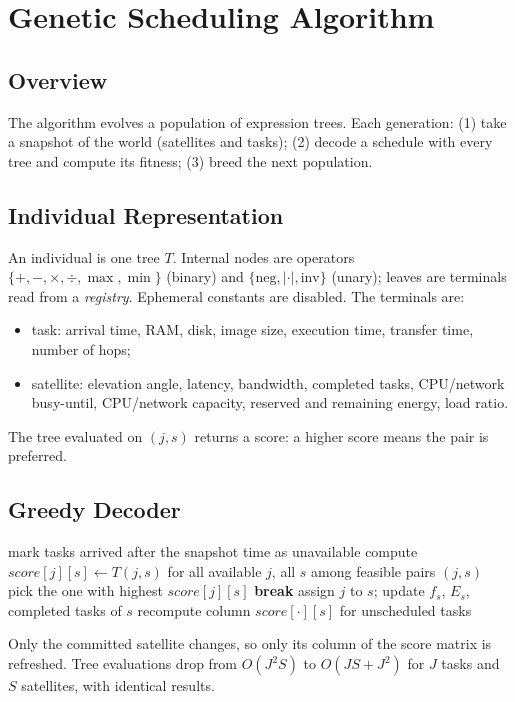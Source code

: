\chapter{Genetic Scheduling Algorithm}
\label{ch:method}

\section{Overview}
The algorithm evolves a population of expression trees. Each generation:
(1) take a snapshot of the world (satellites and tasks); (2) decode a schedule
with every tree and compute its fitness; (3) breed the next population.

\section{Individual Representation}
An individual is one tree $T$. Internal nodes are operators
$\{+,-,\times,\div,\max,\min\}$ (binary) and $\{\text{neg},|\cdot|,\text{inv}\}$
(unary); leaves are terminals read from a \emph{registry}.
Ephemeral constants are disabled. The terminals are:
\begin{itemize}
  \item task: arrival time, RAM, disk, image size, execution time, transfer time, number of hops;
  \item satellite: elevation angle, latency, bandwidth, completed tasks, CPU/network busy-until,
        CPU/network capacity, reserved and remaining energy, load ratio.
\end{itemize}
The tree evaluated on $(j,s)$ returns a score: a higher score means the pair is preferred.

\section{Greedy Decoder}
\begin{algorithm}[h]
\caption{Greedy decoding of a tree $T$}
\begin{algorithmic}[1]
\State mark tasks arrived after the snapshot time as unavailable
\State compute $score[j][s] \gets T(j,s)$ for all available $j$, all $s$
  \State among feasible pairs $(j,s)$ pick the one with highest $score[j][s]$
   \textbf{break} \EndIf
  \State assign $j$ to $s$; update $f_s$, $E_s$, completed tasks of $s$
  \State recompute column $score[\cdot][s]$ for unscheduled tasks
\EndWhile
\end{algorithmic}
\end{algorithm}
Only the committed satellite changes, so only its column of the score matrix is
refreshed. Tree evaluations drop from $O(J^2 S)$ to $O(JS + J^2)$ for $J$ tasks
and $S$ satellites, with identical results.

